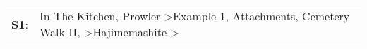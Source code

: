\begin{supertabular}{p{0.03\textwidth}p{0.92\textwidth}}
 \textbf{S1}:  &  In The Kitchen\textsuperscript{}, \enspace Prowler\textsuperscript{} \textgreater \enspace Example 1\textsuperscript{}, \enspace Attachments\textsuperscript{}, \enspace Cemetery Walk II\textsuperscript{}, \textsuperscript{} \textgreater \enspace Hajimemashite\textsuperscript{} \textgreater {}\textsuperscript{}  \enspace  \\
\end{supertabular}
